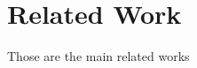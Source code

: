\section{Related Work}
\label{sec:chap1}

Those are the main related works \cite{TipaldiFLIRT} \cite{TipaldiGFLIP} \cite{Sivic} \cite{Nister06}